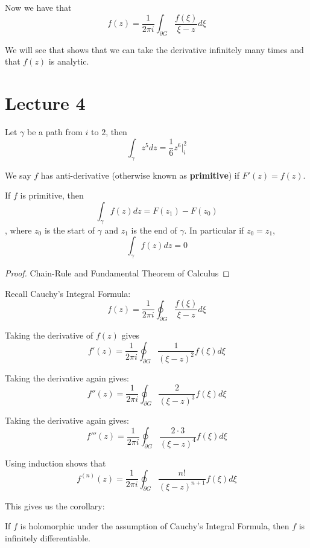 \documentclass{article}
\begin{document}
Now we have that
\[f(z) = \frac{1}{2\pi i} \int_{\partial G} \frac{f(\xi)}{\xi - z} d\xi\]

We will see that shows that we can take the derivative infinitely many times and that $f(z)$ is analytic.

\newpage
\section{Lecture 4}

\begin{example}
Let $\gamma$ be a path from $i$ to $2$, then
\[\int_\gamma z^5 dz = \frac{1}{6} z^6 |_i^2\]
\end{example}


\begin{definition}
We say $f$ has anti-derivative (otherwise known as \textbf{primitive}) if $F'(z) = f(z)$.
\end{definition}

\begin{proposition}
    If $f$ is primitive, then
    \[\int_\gamma f(z) dz = F(z_1) - F(z_0)\]
    , where $z_0$ is the start of $\gamma$ and $z_1$ is the end of $\gamma$. In particular if $z_0 = z_1$,
    \[\int_\gamma f(z) dz = 0\]
\end{proposition}

\begin{proof}
Chain-Rule and Fundamental Theorem of Calculus
\end{proof}

Recall Cauchy's Integral Formula:
\[f(z) = \frac{1}{2\pi i} \oint_{\partial G} \frac{f(\xi)}{\xi - z} d\xi\]

Taking the derivative of $f(z)$ gives
\[f'(z) = \frac{1}{2\pi i}  \oint_{\partial G} \frac{1}{(\xi - z)^2} f(\xi) d\xi\]

Taking the derivative again gives:
\[f''(z) = \frac{1}{2\pi i}  \oint_{\partial G} \frac{2}{(\xi - z)^3} f(\xi) d\xi\]

Taking the derivative again gives:
\[f'''(z) = \frac{1}{2\pi i}  \oint_{\partial G} \frac{2 \cdot 3}{(\xi - z)^4} f(\xi) d\xi\]

Using induction shows that
\[f^{(n)}(z) = \frac{1}{2 \pi i} \oint_{\partial G} \frac{n!}{(\xi - z)^{n+1}} f(\xi) d\xi\]

This gives us the corollary:

\begin{corollary}
    If $f$ is holomorphic under the assumption of Cauchy's Integral Formula, then $f$ is infinitely differentiable.
\end{corollary}
\end{document}
